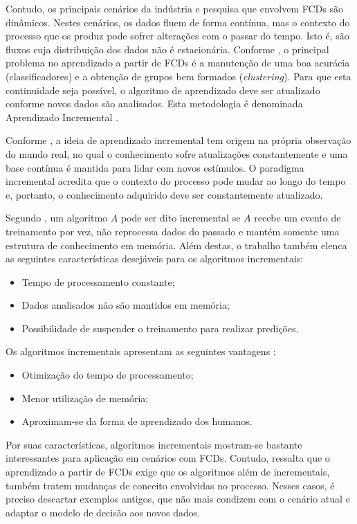 \documentclass[qual, classic, a4paper]{ufbathesis}
\begin{document}
Contudo, os principais cenários da indústria e pesquisa que envolvem FCDs são dinâmicos.
Nestes cenários, os dados fluem de forma contínua, 
mas o contexto do processo que os produz pode sofrer alterações com o passar do tempo.
Isto é, são fluxos cuja distribuição dos dados não é estacionária.
Conforme \cite{Gama:Rodrigues:2009}, o principal problema no aprendizado a partir de FCDs é a manutenção de uma boa acurácia (classificadores) e a obtenção de grupos bem formados (\textit{clustering}).
Para que esta continuidade seja possível, o algoritmo de aprendizado deve ser atualizado conforme novos dados são analisados.
Esta metodologia é denominada Aprendizado Incremental \cite{Gama:2014:SCD:2597757.2523813}.

Conforme \cite{Fisher:1987:KAV:639960.639990}, a ideia de aprendizado incremental tem origem na própria observação do mundo real, 
no qual o conhecimento sofre atualizações constantemente e uma base contínua é mantida para lidar com novos estímulos.
O paradigma incremental acredita que o contexto do processo pode mudar ao longo do tempo e, portanto, 
o conhecimento adquirido deve ser constantemente atualizado. 

Segundo \cite{Langley:reimann1995learning}, um algoritmo $A$ pode ser dito incremental se $A$ recebe um evento de treinamento por vez,
não reprocessa dados do passado e mantém somente uma estrutura de conhecimento em memória. 
Além destas, o trabalho também elenca as seguintes características desejáveis para os algoritmos incrementais:

\begin{itemize}
    \item Tempo de processamento constante;
    \item Dados analisados não são mantidos em memória;
    \item Possibilidade de suspender o treinamento para realizar predições.
\end{itemize}

Os algoritmos incrementais apresentam as seguintes vantagens \cite{pinto2005algoritmos}:

\begin{itemize}
    \item Otimização do tempo de processamento;
    \item Menor utilização de memória;
    \item Aproximam-se da forma de aprendizado dos humanos.
\end{itemize}

Por suas características, algoritmos incrementais mostram-se bastante interessantes para aplicação em cenários com FCDs.
Contudo, \cite{GamaMCR04} ressalta que o aprendizado a partir de FCDs exige que os algoritmos além de incrementais, 
também tratem mudanças de conceito envolvidas no processo.
Nesses casos, é preciso descartar exemplos antigos, que não mais condizem com o cenário atual e adaptar o modelo de decisão aos novos dados.
\end{document}
